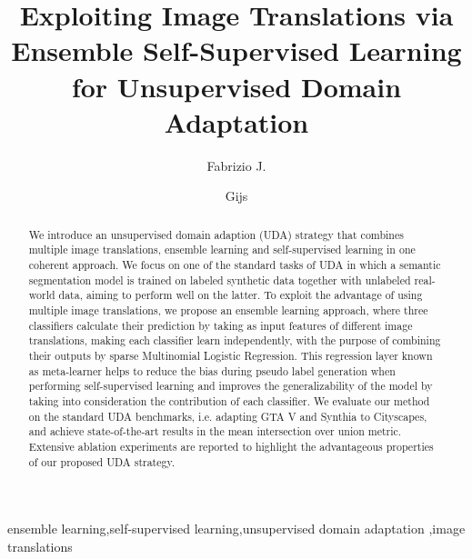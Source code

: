 \documentclass[times,twocolumn,preprint,3p,authoryear]{elsarticle}
\begin{document}
\ifpreprint
  \setcounter{page}{1}
\else
  \setcounter{page}{1}
\fi

\begin{frontmatter}

\title{Exploiting Image Translations via Ensemble Self-Supervised Learning for Unsupervised Domain Adaptation}



\author[1]{Fabrizio J. }
\author[1]{Gijs }


\address[1]{Eindhoven University of Technology, Department of Electrical Engineering, Groene Loper 12, 5612AZ Eindhoven, The Netherlands}






\begin{abstract}
    We introduce an unsupervised domain adaption (UDA) strategy that combines multiple image translations, ensemble learning and self-supervised learning in one coherent approach. We focus on one of the standard tasks of UDA in which a semantic segmentation model is trained on labeled synthetic data together with unlabeled real-world data, aiming to perform well on the latter. To exploit the advantage of using multiple image translations, we propose an ensemble learning approach, where three classifiers calculate their prediction by taking as input features of different image translations, making each classifier learn independently, with the purpose of combining their outputs by sparse Multinomial Logistic Regression. This regression layer known as meta-learner helps to reduce the bias during pseudo label generation when performing self-supervised learning and improves the generalizability of the model by taking into consideration the contribution of each classifier. We evaluate our method on the standard UDA benchmarks, i.e. adapting GTA V and Synthia to Cityscapes, and achieve state-of-the-art results in the mean intersection over union metric. Extensive ablation experiments are reported to highlight the advantageous properties of our proposed UDA strategy.
\end{abstract}\begin{keyword}
ensemble learning\sep self-supervised learning\sep unsupervised domain adaptation \sep image translations
\end{keyword}

\end{frontmatter}













\end{document}
